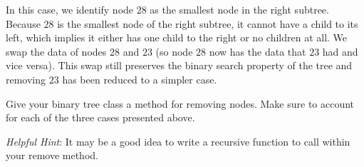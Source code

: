 \begin{enumerate}
In this case, we identify node $28$ as the smallest node in the right subtree.
Because $28$ is the smallest node of the right subtree, it cannot have a child to its left, which implies it either has one child to the right or no children at all.
We swap the data of nodes $28$ and $23$ (so node $28$ now has the data that $23$ had and vice versa).
This swap still preserves the binary search property of the tree and removing $23$ has been reduced to a simpler case.
\begin{minipage}{0.3\textwidth}
\end{minipage}
\begin{minipage}{0.2\textwidth}
   \begin{center}
   \end{center}
\end{minipage}
\begin{minipage}{0.3\textwidth}
\end{minipage}
\end{enumerate}

\begin{problem}
Give your binary tree class a method for removing nodes.
Make sure to account for each of the three cases presented above.

\emph{Helpful Hint}: It may be a good idea to write a recursive function to call within your remove method. 
\label{prob:Binary Removal}
\end{problem}

